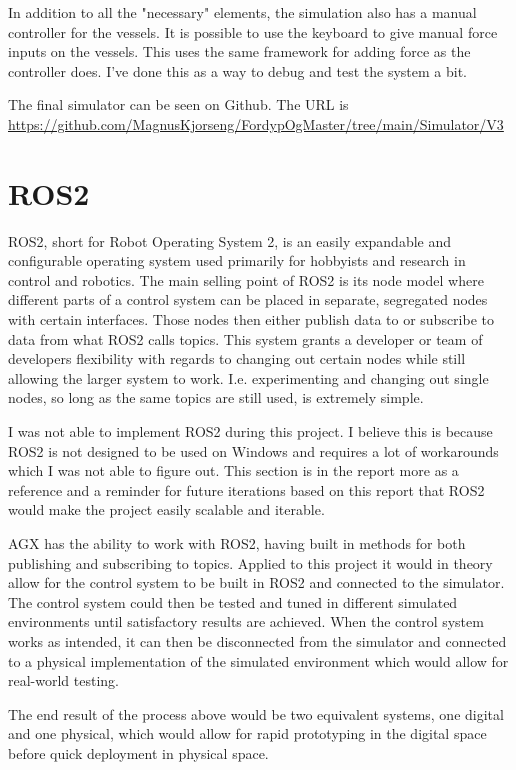 In addition to all the "necessary" elements, the simulation also has a manual controller for the vessels. It is possible to use the keyboard to give manual force inputs on the vessels. This uses the same framework for adding force as the controller does. I've done this as a way to debug and test the system a bit.

The final simulator can be seen on Github\cite{noauthor_fordypogmastersimulator_nodate}. The URL is \url{https://github.com/MagnusKjorseng/FordypOgMaster/tree/main/Simulator/V3}

\section{ROS2}
\label{sec:ros}
ROS2, short for Robot Operating System 2, is an easily expandable and configurable operating system used primarily for hobbyists and research in control and robotics. The main selling point of ROS2 is its node model where different parts of a control system can be placed in separate, segregated nodes with certain interfaces. Those nodes then either publish data to or subscribe to data from what ROS2 calls topics. This system grants a developer or team of developers flexibility with regards to changing out certain nodes while still allowing the larger system to work. I.e. experimenting and changing out single nodes, so long as the same topics are still used, is extremely simple. 

I was not able to implement ROS2 during this project. I believe this is because ROS2 is not designed to be used on Windows and requires a lot of workarounds which I was not able to figure out. This section is in the report more as a reference and a reminder for future iterations based on this report that ROS2 would make the project easily scalable and iterable. 

AGX has the ability to work with ROS2, having built in methods for both publishing and subscribing to topics. Applied to this project it would in theory allow for the control system to be built in ROS2 and connected to the simulator. The control system could then be tested and tuned in different simulated environments until satisfactory results are achieved. When the control system works as intended, it can then be disconnected from the simulator and connected to a physical implementation of the simulated environment which would allow for real-world testing. 

The end result of the process above would be two equivalent systems, one digital and one physical, which would allow for rapid prototyping in the digital space before quick deployment in physical space. 

